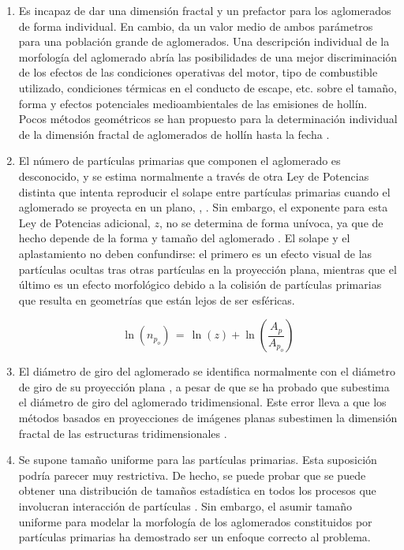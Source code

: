 \begin{enumerate}
\item Es incapaz de dar una dimensión fractal y un prefactor para los aglomerados de forma individual. En cambio, da un valor medio de ambos parámetros para una población grande de aglomerados. Una descripción individual de la morfología del aglomerado abría las posibilidades de una mejor discriminación de los efectos de las condiciones operativas del motor, tipo de combustible utilizado, condiciones térmicas en el conducto de escape, etc. sobre el tamaño, forma y efectos potenciales medioambientales de las emisiones de hollín. Pocos métodos geométricos se han propuesto para la determinación individual de la dimensión fractal de aglomerados de hollín hasta la fecha \cite{lattuadaetal:2003,lapuertaetal:2006,wozniaketal:2012}.
\item El número de partículas primarias que componen el aglomerado es desconocido, y se estima normalmente a través de otra Ley de Potencias distinta que intenta reproducir el solape entre partículas primarias cuando el aglomerado se proyecta en un plano, \cite{medaliaetal:1969,megaridisetal:1990}, \cite{brasiletal:1999,leeetal:2003}. Sin embargo, el exponente para esta Ley de Potencias adicional, $z$, no se determina de forma unívoca, ya que de hecho depende de la forma y tamaño del aglomerado \cite{ohetal:1997}. El solape y el aplastamiento no deben confundirse: el primero es un efecto visual de las partículas ocultas tras otras partículas en la proyección plana, mientras que el último es un efecto morfológico debido a la colisión de partículas primarias que resulta en geometrías que están lejos de ser esféricas.

\begin{equation}
\ln(n_{p_o})\,=\,\ln(z)+\ln(\frac{A_{p}}{A_{p_o}})
\label{eq:leydepotenciassolape}
\end{equation}

\item El diámetro de giro del aglomerado se identifica normalmente con el diámetro de giro de su proyección plana \cite{rogaketal:1992,koyluetal:1995,ohetal:1997}, a pesar de que se ha probado que subestima el diámetro de giro del aglomerado tridimensional. Este error lleva a que los métodos basados en proyecciones de imágenes planas subestimen la dimensión fractal de las estructuras tridimensionales \cite{rogaketal:1992,nelsonetal:1990,adachieetal:2007}.

\item Se supone tamaño uniforme para las partículas primarias. Esta suposición podría parecer muy restrictiva. De hecho, se puede probar que se puede obtener una distribución de tamaños estadística en todos los procesos que involucran interacción de partículas \cite{busheletal:1998}. Sin embargo, el asumir tamaño uniforme para modelar la morfología de los aglomerados constituidos por partículas primarias ha demostrado ser un enfoque correcto al problema.


\end{enumerate}
